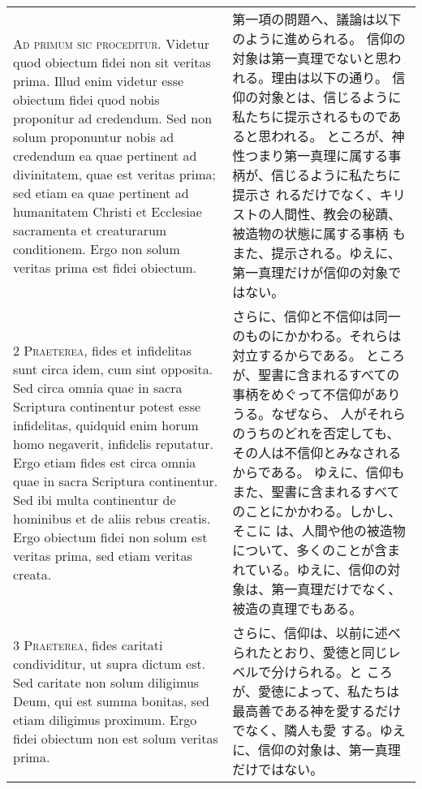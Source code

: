\documentclass[10pt]{jsarticle} %
\begin{document}
\begin{longtable}{p{21em}p{21em}}

{\huge A}{\scshape d primum sic proceditur}. Videtur quod
obiectum fidei non sit veritas prima. Illud enim videtur esse obiectum
fidei quod nobis proponitur ad credendum. Sed non solum proponuntur
nobis ad credendum ea quae pertinent ad divinitatem, quae est veritas
prima; sed etiam ea quae pertinent ad humanitatem Christi et Ecclesiae
sacramenta et creaturarum conditionem. Ergo non solum veritas prima est
fidei obiectum.


&

第一項の問題へ、議論は以下のように進められる。
信仰の対象は第一真理でないと思われる。理由は以下の通り。
信仰の対象とは、信じるように私たちに提示されるものであると思われる。
ところが、神性つまり第一真理に属する事柄が、信じるように私たちに提示さ
 れるだけでなく、キリストの人間性、教会の秘蹟、被造物の状態に属する事柄
 もまた、提示される。ゆえに、第一真理だけが信仰の対象ではない。


\\


{\scshape 2 Praeterea}, fides et infidelitas sunt
circa idem, cum sint opposita. Sed circa omnia quae in sacra Scriptura
continentur potest esse infidelitas, quidquid enim horum homo negaverit,
infidelis reputatur. Ergo etiam fides est circa omnia quae in sacra
Scriptura continentur. Sed ibi multa continentur de hominibus et de
aliis rebus creatis. Ergo obiectum fidei non solum est veritas prima,
sed etiam veritas creata.


&

さらに、信仰と不信仰は同一のものにかかわる。それらは対立するからである。
ところが、聖書に含まれるすべての事柄をめぐって不信仰がありうる。なぜなら、
人がそれらのうちのどれを否定しても、その人は不信仰とみなされるからである。
ゆえに、信仰もまた、聖書に含まれるすべてのことにかかわる。しかし、そこに
は、人間や他の被造物について、多くのことが含まれている。ゆえに、信仰の対
象は、第一真理だけでなく、被造の真理でもある。

\\


{\scshape 3 Praeterea}, fides caritati
condividitur, ut supra dictum est. Sed caritate non solum diligimus
Deum, qui est summa bonitas, sed etiam diligimus proximum. Ergo fidei
obiectum non est solum veritas prima.


&

さらに、信仰は、以前に述べられたとおり、愛徳と同じレベルで分けられる。と
ころが、愛徳によって、私たちは最高善である神を愛するだけでなく、隣人も愛
する。ゆえに、信仰の対象は、第一真理だけではない。
\\



\end{longtable}
\end{document}
